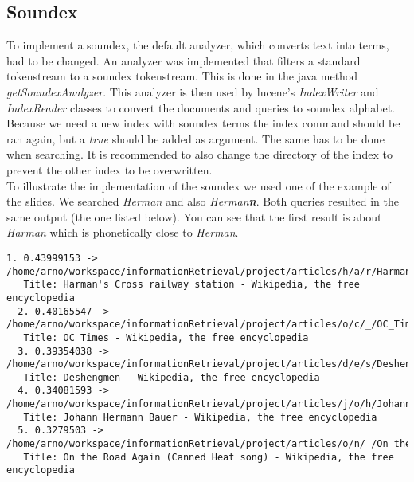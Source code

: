 \documentclass{article}
\begin{document}
\subsection{Soundex}
To implement a soundex, the default analyzer, which converts text into terms, had to be changed. An analyzer was implemented that filters a standard tokenstream to a soundex tokenstream. This is done in the java method \emph{getSoundexAnalyzer}. This analyzer is then used by lucene's \emph{IndexWriter} and \emph{IndexReader} classes to convert the documents and queries to soundex alphabet.\\
Because we need a new index with soundex terms the index command should be ran again, but a \emph{true} should be added as argument. The same has to be done when searching. It is recommended to also change the directory of the index to prevent the other index to be overwritten.\\
To illustrate the implementation of the soundex we used one of the example of the slides. We searched \emph{Herman} and also \emph{Herman\textbf{n}}. Both queries resulted in the same output (the one listed below). You can see that the first result is about \emph{Harman} which is phonetically close to \emph{Herman}.
\begin{lstlisting}[basicstyle=\tiny\ttfamily, caption={High threshold}]
  1. 0.43999153 -> /home/arno/workspace/informationRetrieval/project/articles/h/a/r/Harman's_Cross_railway_station_0dae.html
   Title: Harman's Cross railway station - Wikipedia, the free encyclopedia
  2. 0.40165547 -> /home/arno/workspace/informationRetrieval/project/articles/o/c/_/OC_Times_3f4f.html
   Title: OC Times - Wikipedia, the free encyclopedia
  3. 0.39354038 -> /home/arno/workspace/informationRetrieval/project/articles/d/e/s/Deshengmen.html
   Title: Deshengmen - Wikipedia, the free encyclopedia
  4. 0.34081593 -> /home/arno/workspace/informationRetrieval/project/articles/j/o/h/Johann_Hermann_Bauer_4adc.html
   Title: Johann Hermann Bauer - Wikipedia, the free encyclopedia
  5. 0.3279503 -> /home/arno/workspace/informationRetrieval/project/articles/o/n/_/On_the_Road_Again_(Canned_Heat_song)_ed5e.html
   Title: On the Road Again (Canned Heat song) - Wikipedia, the free encyclopedia
\end{lstlisting}
\end{document}
